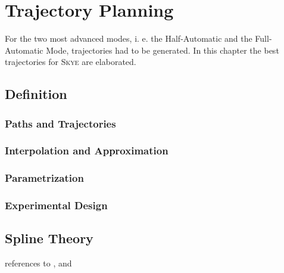 \chapter{Trajectory Planning}
\label{cha:trajectory}
For the two most advanced modes, i. e. the Half-Automatic and the Full-Automatic Mode, trajectories had to be generated. In this chapter the best trajectories for \textsc{Skye} are elaborated.





\section{Definition}
\label{sec:definition}
\subsection{Paths and Trajectories}
\subsection{Interpolation and Approximation}
\subsection{Parametrization}
\subsection{Experimental Design}

\section{Spline Theory}
\label{sec:splineTheory}
references to \cite{engeln}, \cite{biagiotti} and \cite{doessegger}
